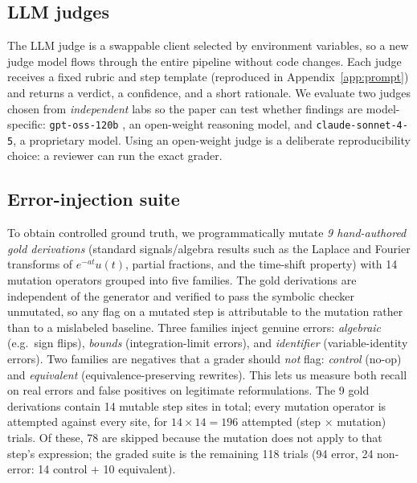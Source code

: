 \subsection{LLM judges}
The LLM judge is a swappable client selected by environment variables, so a new
judge model flows through the entire pipeline without code changes. Each judge
receives a fixed rubric and step template (reproduced in
Appendix~\ref{app:prompt}) and returns a verdict, a confidence, and a short
rationale. We evaluate two judges chosen from \emph{independent} labs so the
paper can test whether findings are model-specific:
\texttt{gpt-oss-120b} \citep{openai2025gptoss}, an open-weight reasoning model, and
\texttt{claude-sonnet-4-5}, a proprietary model. Using an open-weight judge is a
deliberate reproducibility choice: a reviewer can run the exact grader.

\subsection{Error-injection suite}
To obtain controlled ground truth, we programmatically mutate \emph{9
hand-authored gold derivations} (standard signals/algebra results such as the
Laplace and Fourier transforms of $e^{-at}u(t)$, partial fractions, and the
time-shift property) with 14 mutation operators grouped into five families. The
gold derivations are independent of the generator and verified to pass the
symbolic checker unmutated, so any flag on a mutated step is attributable to the
mutation rather than to a mislabeled baseline. Three families
inject genuine errors: \emph{algebraic} (e.g.\ sign flips), \emph{bounds}
(integration-limit errors), and \emph{identifier} (variable-identity errors).
Two families are negatives that a grader should \emph{not} flag:
\emph{control} (no-op) and \emph{equivalent} (equivalence-preserving rewrites).
This lets us measure both recall on real errors and false positives on
legitimate reformulations. The 9 gold derivations contain 14 mutable step
sites in total; every mutation operator is attempted against every site, for
$14 \times 14 = 196$ attempted (step $\times$ mutation) trials. Of these,
78 are skipped because the mutation does not apply to that step's expression;
the graded suite is the remaining 118 trials (94 error, 24 non-error:
14 control $+$ 10 equivalent).
